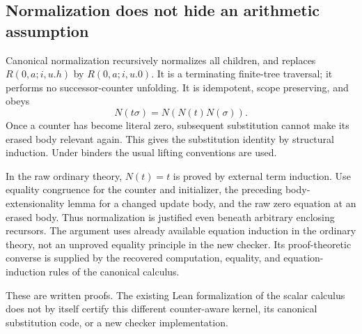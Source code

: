 \subsection{Normalization does not hide an arithmetic assumption}\label{sec:normalization-soundness}

Canonical normalization recursively normalizes all children, and replaces
$R(0,a;i,u.h)$ by $R(0,a;i,u.0)$. It is a terminating finite-tree
traversal; it performs no successor-counter unfolding. It is idempotent,
scope preserving, and obeys
\[
 N(t\sigma)=N(N(t)N(\sigma)).
\]
Once a counter has become literal zero, subsequent substitution cannot make
its erased body relevant again. This gives the substitution identity by
structural induction. Under binders the usual lifting conventions are used.

In the raw ordinary theory, $N(t)=t$ is proved by external term induction.
Use equality congruence for the counter and initializer, the preceding
body-extensionality lemma for a changed update body, and the raw zero
equation at an erased body. Thus normalization is justified even beneath
arbitrary enclosing recursors. The argument uses already available equation
induction in the ordinary theory, not an unproved equality principle in the
new checker. Its proof-theoretic converse is supplied by the recovered
computation, equality, and equation-induction rules of the canonical calculus.

These are written proofs. The existing Lean formalization of the scalar
calculus does not by itself certify this different counter-aware kernel,
its canonical substitution code, or a new checker implementation.
